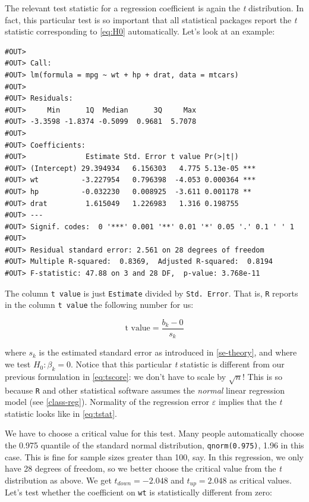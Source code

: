 \documentclass[]{book}
\begin{document}
The relevant test statistic for a regression coefficient is again the \emph{t} distribution. In fact, this particular test is so important that all statistical packages report the \emph{t} statistic corresponding to \eqref{eq:H0} automatically. Let's look at an example:

\begin{verbatim}
#OUT> 
#OUT> Call:
#OUT> lm(formula = mpg ~ wt + hp + drat, data = mtcars)
#OUT> 
#OUT> Residuals:
#OUT>     Min      1Q  Median      3Q     Max 
#OUT> -3.3598 -1.8374 -0.5099  0.9681  5.7078 
#OUT> 
#OUT> Coefficients:
#OUT>              Estimate Std. Error t value Pr(>|t|)    
#OUT> (Intercept) 29.394934   6.156303   4.775 5.13e-05 ***
#OUT> wt          -3.227954   0.796398  -4.053 0.000364 ***
#OUT> hp          -0.032230   0.008925  -3.611 0.001178 ** 
#OUT> drat         1.615049   1.226983   1.316 0.198755    
#OUT> ---
#OUT> Signif. codes:  0 '***' 0.001 '**' 0.01 '*' 0.05 '.' 0.1 ' ' 1
#OUT> 
#OUT> Residual standard error: 2.561 on 28 degrees of freedom
#OUT> Multiple R-squared:  0.8369,  Adjusted R-squared:  0.8194 
#OUT> F-statistic: 47.88 on 3 and 28 DF,  p-value: 3.768e-11
\end{verbatim}

The column \texttt{t\ value} is just \texttt{Estimate} divided by \texttt{Std.\ Error}. That is, \texttt{R} reports in the column \texttt{t\ value} the following number for us:

\begin{equation}
\text{t value} = \frac{b_k-0}{s_k}  \label{eq:tstat}
\end{equation}

where \(s_k\) is the estimated standard error as introduced in \ref{se-theory}, and where we test \(H_0:\beta_k = 0\). Notice that this particular \emph{t} statistic is different from our previous formulation in \eqref{eq:tscore}: we don't have to scale by \(\sqrt{n}\)! This is so because \texttt{R} and other statistical software assumes the \emph{normal} linear regression model (see \ref{class-reg}). Normality of the regression error \(\varepsilon\) implies that the \emph{t} statistic looks like in \eqref{eq:tstat}.

We have to choose a critical value for this test. Many people automatically choose the 0.975 quantile of the standard normal distribution, \texttt{qnorm(0.975)}, 1.96 in this case. This is fine for sample sizes greater than 100, say. In this regression, we only have 28 degrees of freedom, so we better choose the critical value from the \emph{t} distribution as above. We get \(t_{down} = -2.048\) and \(t_{up} = 2.048\) as critical values. Let's test whether the coefficient on \texttt{wt} is statistically different from zero:
\end{document}
